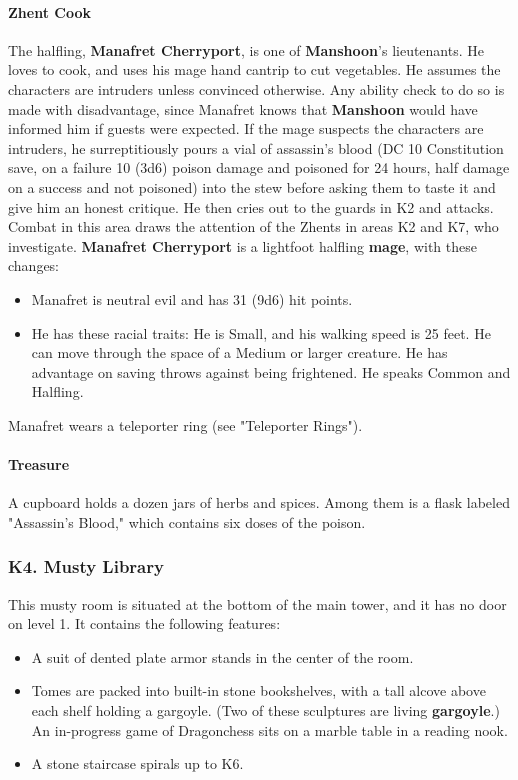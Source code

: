 \documentclass[10pt,a4paper,twoside,twocolumn,openany,nodeprecatedcode]{dndbook}
\begin{document}
\paragraph{Zhent Cook}
The halfling, \textbf{Manafret Cherryport}, is one of \textbf{Manshoon}'s lieutenants. He loves to cook, and uses his mage hand cantrip to cut vegetables. He assumes the characters are intruders unless convinced otherwise. Any ability check to do so is made with disadvantage, since Manafret knows that \textbf{Manshoon} would have informed him if guests were expected. If the mage suspects the characters are intruders, he surreptitiously pours a vial of assassin's blood (DC 10 Constitution save, on a failure 10 (3d6) poison damage and poisoned for 24 hours, half damage on a success and not poisoned) into the stew before asking them to taste it and give him an honest critique. He then cries out to the guards in K2 and attacks. Combat in this area draws the attention of the Zhents in areas K2 and K7, who investigate.
\textbf{Manafret Cherryport} is a lightfoot halfling \textbf{mage}, with these changes:
\begin{itemize}

\item Manafret is neutral evil and has 31 (9d6) hit points.
\item He has these racial traits: He is Small, and his walking speed is 25 feet. He can move through the space of a Medium or larger creature. He has advantage on saving throws against being frightened. He speaks Common and Halfling.
\end{itemize}


Manafret wears a teleporter ring (see "Teleporter Rings").
\paragraph{Treasure}
A cupboard holds a dozen jars of herbs and spices. Among them is a flask labeled "Assassin's Blood," which contains six doses of the poison.
\subsubsection{K4. Musty Library}
This musty room is situated at the bottom of the main tower, and it has no door on level 1. It contains the following features:
\begin{itemize}

\item A suit of dented plate armor stands in the center of the room.
\item Tomes are packed into built-in stone bookshelves, with a tall alcove above each shelf holding a gargoyle. (Two of these sculptures are living \textbf{gargoyle}.) An in-progress game of Dragonchess sits on a marble table in a reading nook.
\item A stone staircase spirals up to K6.
\end{itemize}
\end{document}
